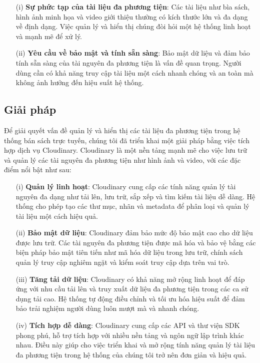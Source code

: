\documentclass[../DoAn.tex]{subfiles}
\begin{document}
\begin{enumerate}
    \item[(i)] \textbf{Sự phức tạp của tài liệu đa phương tiện}: Các tài liệu như bìa sách, hình ảnh minh họa và video giới thiệu thường có kích thước lớn và đa dạng về định dạng. Việc quản lý và hiển thị chúng đòi hỏi một hệ thống linh hoạt và mạnh mẽ để xử lý.
    \item[(ii)] \textbf{Yêu cầu về bảo mật và tính sẵn sàng}: Bảo mật dữ liệu và đảm bảo tính sẵn sàng của tài nguyên đa phương tiện là vấn đề quan trọng. Người dùng cần có khả năng truy cập tài liệu một cách nhanh chóng và an toàn mà không ảnh hưởng đến hiệu suất hệ thống.
\end{enumerate}

\subsection{Giải pháp}
Để giải quyết vấn đề quản lý và hiển thị các tài liệu đa phương tiện trong hệ thống bán sách trực tuyến, chúng tôi đã triển khai một giải pháp bằng việc tích hợp dịch vụ Cloudinary. Cloudinary là một nền tảng mạnh mẽ cho việc lưu trữ và quản lý các tài nguyên đa phương tiện như hình ảnh và video, với các đặc điểm nổi bật như sau:
\begin{enumerate}
    \item[(i)] \textbf{Quản lý linh hoạt}: Cloudinary cung cấp các tính năng quản lý tài nguyên đa dạng như tải lên, lưu trữ, sắp xếp và tìm kiếm tài liệu dễ dàng. Hệ thống cho phép tạo các thư mục, nhãn và metadata để phân loại và quản lý tài liệu một cách hiệu quả.
    \item[(ii)] \textbf{Bảo mật dữ liệu}: Cloudinary đảm bảo mức độ bảo mật cao cho dữ liệu được lưu trữ. Các tài nguyên đa phương tiện được mã hóa và bảo vệ bằng các biện pháp bảo mật tiên tiến như mã hóa dữ liệu trong lưu trữ, chính sách quản lý truy cập nghiêm ngặt và kiểm soát truy cập dựa trên vai trò.
    \item[(iii)] \textbf{Tăng tải dữ liệu}: Cloudinary có khả năng mở rộng linh hoạt để đáp ứng với nhu cầu tải lên và truy xuất dữ liệu đa phương tiện trong các ca sử dụng tải cao. Hệ thống tự động điều chỉnh và tối ưu hóa hiệu suất để đảm bảo trải nghiệm người dùng luôn mượt mà và nhanh chóng.
    \item[(iv)] \textbf{Tích hợp dễ dàng}: Cloudinary cung cấp các API và thư viện SDK phong phú, hỗ trợ tích hợp với nhiều nền tảng và ngôn ngữ lập trình khác nhau. Điều này giúp cho việc triển khai và mở rộng tính năng quản lý tài liệu đa phương tiện trong hệ thống của chúng tôi trở nên đơn giản và hiệu quả.
\end{enumerate}
\end{document}
